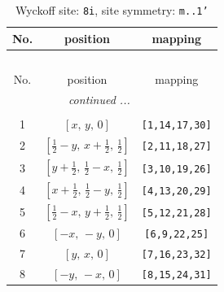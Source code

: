 \documentclass[fleqn,8pt]{jsarticle}
\begin{document}
\renewcommand{\arraystretch}{1.2}
\begin{longtable}{ccc}
\caption{Wyckoff site: {\tt 8i}, site symmetry: {\tt m..1'}}
 \\
 \hline \hline
No. & position & mapping \\ \hline \endfirsthead

\multicolumn{2}{l}{\tablename\ \thetable{}} \\
 \hline \hline
No. & position & mapping \\ \hline \endhead

 \hline \hline
\multicolumn{2}{r}{\footnotesize\it continued ...} \\ \endfoot

 \hline \hline
\multicolumn{2}{r}{} \\ \endlastfoot

1 & $\left[ x,\, y,\, 0 \right]$ & {\tt [1,14,17,30]} \\ \hline
2 & $\left[ \frac{1}{2} - y,\, x + \frac{1}{2},\, \frac{1}{2} \right]$ & {\tt [2,11,18,27]} \\ \hline
3 & $\left[ y + \frac{1}{2},\, \frac{1}{2} - x,\, \frac{1}{2} \right]$ & {\tt [3,10,19,26]} \\ \hline
4 & $\left[ x + \frac{1}{2},\, \frac{1}{2} - y,\, \frac{1}{2} \right]$ & {\tt [4,13,20,29]} \\ \hline
5 & $\left[ \frac{1}{2} - x,\, y + \frac{1}{2},\, \frac{1}{2} \right]$ & {\tt [5,12,21,28]} \\ \hline
6 & $\left[ - x,\, - y,\, 0 \right]$ & {\tt [6,9,22,25]} \\ \hline
7 & $\left[ y,\, x,\, 0 \right]$ & {\tt [7,16,23,32]} \\ \hline
8 & $\left[ - y,\, - x,\, 0 \right]$ & {\tt [8,15,24,31]} \\
\end{longtable}
\renewcommand{\arraystretch}{1.2}
\end{document}
